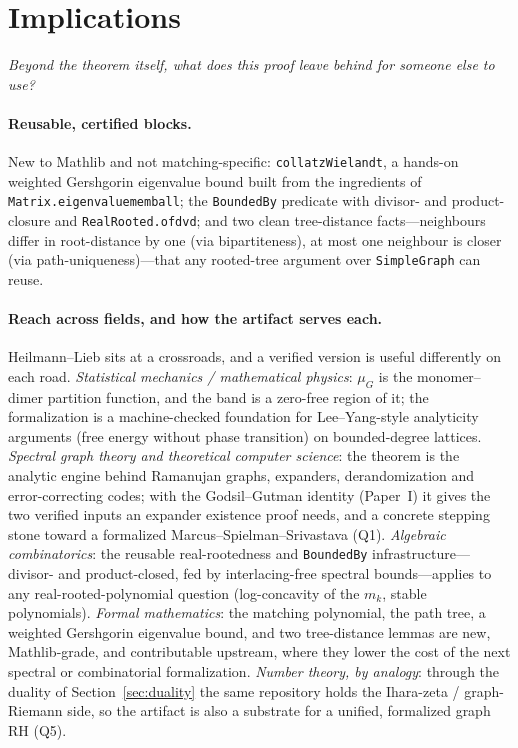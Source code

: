 \documentclass[11pt]{article}
\newcommand{\lean}[1]{{\def\_{\textunderscore\allowbreak}\texttt{#1}}}
\begin{document}
\section{Implications}
\label{sec:implications}

\emph{Beyond the theorem itself, what does this proof leave behind for someone
else to use?}

\paragraph{Reusable, certified blocks.} New to Mathlib and not matching-specific:
\lean{collatzWielandt}, a hands-on weighted Gershgorin eigenvalue bound built from
the ingredients of \lean{Matrix.eigenvalue\_mem\_ball}; the \lean{BoundedBy}
predicate with divisor- and product-closure and \lean{RealRooted.of\_dvd}; and two
clean tree-distance facts---neighbours differ in root-distance by one (via
bipartiteness), at most one neighbour is closer (via path-uniqueness)---that any
rooted-tree argument over \lean{SimpleGraph} can reuse.

\paragraph{Reach across fields, and how the artifact serves each.} Heilmann--Lieb
sits at a crossroads, and a verified version is useful differently on each road.
\emph{Statistical mechanics / mathematical physics}: $\mu_G$ is the monomer--dimer
partition function, and the band is a zero-free region of it; the formalization is
a machine-checked foundation for Lee--Yang-style analyticity arguments (free energy
without phase transition) on bounded-degree lattices. \emph{Spectral graph theory
and theoretical computer science}: the theorem is the analytic engine behind
Ramanujan graphs, expanders, derandomization and error-correcting codes; with the
Godsil--Gutman identity (Paper~I) it gives the two verified inputs an expander
existence proof needs, and a concrete stepping stone toward a formalized
Marcus--Spielman--Srivastava (Q1). \emph{Algebraic combinatorics}: the reusable
real-rootedness and \lean{BoundedBy} infrastructure---divisor- and product-closed,
fed by interlacing-free spectral bounds---applies to any real-rooted-polynomial
question (log-concavity of the $m_k$, stable polynomials). \emph{Formal mathematics}:
the matching polynomial, the path tree, a weighted Gershgorin eigenvalue bound, and
two tree-distance lemmas are new, Mathlib-grade, and contributable upstream, where
they lower the cost of the next spectral or combinatorial formalization.
\emph{Number theory, by analogy}: through the duality of
Section~\ref{sec:duality} the same repository holds the Ihara-zeta / graph-Riemann
side, so the artifact is also a substrate for a unified, formalized graph RH (Q5).
\end{document}
